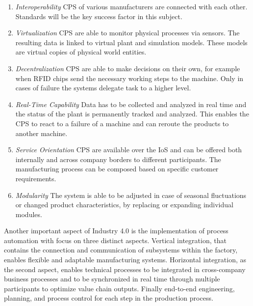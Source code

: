 \begin{enumerate}
  \item \textit{Interoperability} \ac{CPS} of various manufacturers are connected with each other. Standards will be the key success factor in this subject.\autocite[cf.][p. 11]{Her:2015}
  \item \textit{Virtualization} \ac{CPS} are able to monitor physical processes via sensors. The resulting data is linked to virtual plant and simulation models. These models are virtual copies of physical world entities.\autocite[cf.][p. 11]{Her:2015}
  \item \textit{Decentralization} \ac{CPS} are able to make decisions on their own, for example when \ac{RFID} chips send the necessary working steps to the machine. Only in cases of failure the systems delegate task to a higher level.\autocite[cf.][p. 11]{Her:2015}
  \item \textit{Real-Time Capability} Data has to be collected and analyzed in real time and the status of the plant is permanently tracked and analyzed. This enables the \ac{CPS} to react to a failure of a machine and can reroute the products to another machine.\autocite[cf.][p. 11]{Her:2015}
  \item \textit{Service Orientation} \ac{CPS} are available over the \ac{IoS} and can be offered both internally and across company borders to different participants. The manufacturing process can be composed based on specific customer requirements.\autocite[cf.][p. 11]{Her:2015}
  \item \textit{Modularity} The system is able to be adjusted in case of seasonal fluctuations or changed product characteristics, by replacing or expanding individual modules.\autocite[cf.][p. 11]{Her:2015}
\end{enumerate}

Another important aspect of Industry 4.0 is the implementation of process automation with focus on three distinct aspects.
Vertical integration, that contains the connection and communication of subsystems within the factory, enables flexible and adaptable manufacturing systems.\autocite[cf.][p. 7 ff.]{Vbw:2014}
Horizontal integration, as the second aspect, enables technical processes to be integrated in cross-company business processes and to be synchronized in real time through multiple participants to optimize value chain outputs.\autocite[cf.][p. 7 ff.]{Vbw:2014}
Finally end-to-end engineering, planning, and process control for each step in the production process.\autocite[cf.]{Lyd:2016}

